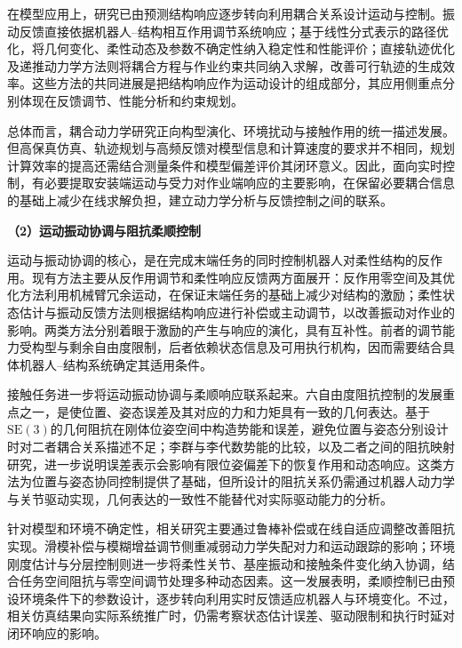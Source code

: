 \documentclass[UTF8,a4paper,zihao=-4,fontset=fandol]{ctexart}
\newcommand{\topic}[1]{\par\addvspace{0.5em}\noindent\textbf{#1}\par\nobreak}
\newcommand{\SE}{\mathrm{SE}(3)}
\begin{document}
在模型应用上，研究已由预测结构响应逐步转向利用耦合关系设计运动与控制。振动反馈直接依据机器人--结构相互作用调节系统响应\cite{swei2020}；基于线性分式表示的路径优化，将几何变化、柔性动态及参数不确定性纳入稳定性和性能评价\cite{rodrigues2025}；直接轨迹优化及递推动力学方法则将耦合方程与作业约束共同纳入求解，改善可行轨迹的生成效率\cite{liu2026,gong2026}。这些方法的共同进展是把结构响应作为运动设计的组成部分，其应用侧重点分别体现在反馈调节、性能分析和约束规划。

总体而言，耦合动力学研究正向构型演化、环境扰动与接触作用的统一描述发展。但高保真仿真、轨迹规划与高频反馈对模型信息和计算速度的要求并不相同，规划计算效率的提高还需结合测量条件和模型偏差评价其闭环意义。因此，面向实时控制，有必要提取安装端运动与受力对作业端响应的主要影响，在保留必要耦合信息的基础上减少在线求解负担，建立动力学分析与反馈控制之间的联系。

\topic{（2）运动振动协调与阻抗柔顺控制}

运动与振动协调的核心，是在完成末端任务的同时控制机器人对柔性结构的反作用。现有方法主要从反作用调节和柔性响应反馈两方面展开：反作用零空间及其优化方法利用机械臂冗余运动，在保证末端任务的基础上减少对结构的激励\cite{nenchev1999,yin2023}；柔性状态估计与振动反馈方法则根据结构响应进行补偿或主动调节，以改善振动对作业的影响\cite{patel2024,zhou2025}。两类方法分别着眼于激励的产生与响应的演化，具有互补性。前者的调节能力受构型与剩余自由度限制，后者依赖状态信息及可用执行机构，因而需要结合具体机器人--结构系统确定其适用条件。

接触任务进一步将运动振动协调与柔顺响应联系起来。六自由度阻抗控制的发展重点之一，是使位置、姿态误差及其对应的力和力矩具有一致的几何表达。基于$\SE$的几何阻抗在刚体位姿空间中构造势能和误差，避免位置与姿态分别设计时对二者耦合关系描述不足\cite{seo2023}；李群与李代数势能的比较，以及二者之间的阻抗映射研究，进一步说明误差表示会影响有限位姿偏差下的恢复作用和动态响应\cite{seo2024,kim2025}。这类方法为位置与姿态协同控制提供了基础，但所设计的阻抗关系仍需通过机器人动力学与关节驱动实现，几何表达的一致性不能替代对实际驱动能力的分析。

针对模型和环境不确定性，相关研究主要通过鲁棒补偿或在线自适应调整改善阻抗实现。滑模补偿与模糊增益调节侧重减弱动力学失配对力和运动跟踪的影响\cite{liudb2024}；环境刚度估计与分层控制则进一步将柔性关节、基座振动和接触条件变化纳入协调，结合任务空间阻抗与零空间调节处理多种动态因素\cite{liuadaptive2026}。这一发展表明，柔顺控制已由预设环境条件下的参数设计，逐步转向利用实时反馈适应机器人与环境变化。不过，相关仿真结果向实际系统推广时，仍需考察状态估计误差、驱动限制和执行时延对闭环响应的影响。
\end{document}
